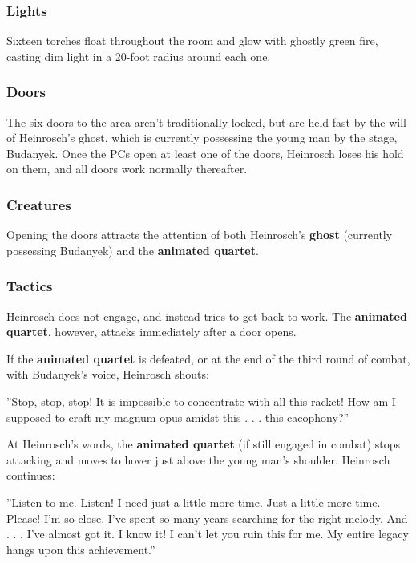 \documentclass[10pt,a4paper,twoside,bg=print,twocolumn,openany,nodeprecatedcode]{dndbook}
\begin{document}
\subsubsection{Lights}
Sixteen torches float throughout the room and glow with ghostly green fire, casting dim light in a 20-foot radius around each one.

\subsubsection{Doors}
The six doors to the area aren't traditionally locked, but are held fast by the will of Heinrosch's ghost, which is currently possessing the young man by the stage, Budanyek. Once the PCs open at least one of the doors, Heinrosch loses his hold on them, and all doors work normally thereafter.

\subsubsection{Creatures}
Opening the doors attracts the attention of both Heinrosch's \textbf{ghost} (currently possessing Budanyek) and the \textbf{animated quartet}.

\subsubsection{Tactics}
Heinrosch does not engage, and instead tries to get back to work. The \textbf{animated quartet}, however, attacks immediately after a door opens.

If the \textbf{animated quartet} is defeated, or at the end of the third round of combat, with Budanyek's voice, Heinrosch shouts:

\begin{DndReadAloud}{}
\DndQuote%
{}
{''Stop, stop, stop! It is impossible to concentrate with all this racket! How am I supposed to craft my magnum opus amidst this . . . this cacophony?''}
{}
\end{DndReadAloud}

At Heinrosch's words, the \textbf{animated quartet} (if still engaged in combat) stops attacking and moves to hover just above the young man's shoulder. Heinrosch continues:

\begin{DndReadAloud}{}
\DndQuote%
{}
{''Listen to me. Listen! I need just a little more time. Just a little more time. Please! I'm so close. I've spent so many years searching for the right melody. And . . . I've almost got it. I know it! I can't let you ruin this for me. My entire legacy hangs upon this achievement.''}
{}
\end{DndReadAloud}
\end{document}
